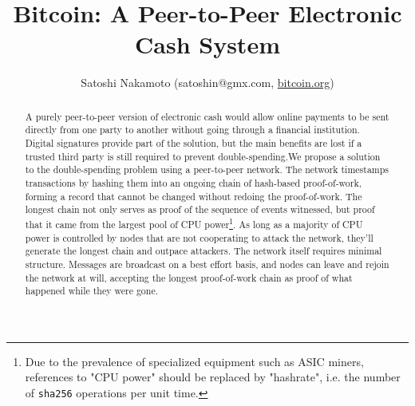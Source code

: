 \documentclass[nohyper]{tufte-handout}
\begin{document}
\renewcommand{\abstractname}{\vspace{-\baselineskip}}

\title{Bitcoin: A Peer-to-Peer Electronic Cash System}
\author{Satoshi Nakamoto \footnotesize{({satoshin@gmx.com}, 
\href{http://www.bitcoin.org}{bitcoin.org})}}
\date{}


\maketitle


\begin{abstract}
\noindent
{} 

A purely peer-to-peer version of electronic cash would allow online payments to be sent directly from one party to another without going through a financial institution. Digital signatures provide part of the solution, but the main benefits are lost if a trusted third party is still required to prevent double-spending.We propose a solution to the double-spending problem using a peer-to-peer network. The network timestamps transactions by hashing them into an ongoing chain of hash-based proof-of-work, forming a record that cannot be changed without redoing the proof-of-work. The longest chain not only serves as proof of the sequence of events witnessed, but proof that it came from the largest pool of CPU power\footnote{Due to the prevalence of specialized equipment such as ASIC miners, references to "CPU power" should be replaced by "hashrate", i.e. the number of \texttt{sha256} operations per unit time.}. As long as a majority of CPU power is controlled by nodes that are not cooperating to attack the network, they'll generate the longest chain and outpace attackers. The network itself requires minimal structure. Messages are broadcast on a best effort basis, and nodes can leave and rejoin the network at will, accepting the longest proof-of-work chain as proof of what happened while they were gone. 
\end{abstract}
\end{document}
